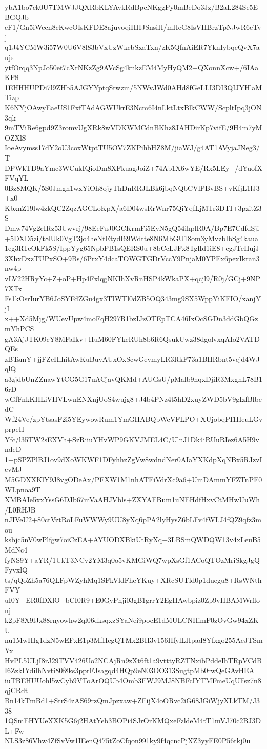 ybA1bo7ck0U7TMWJJQXRbKLYAvkRdBpcNKggPy0mBeDo3Jz/B2aL284Se5EBGQJb
eF1/Gn5iWecn8cKwcOIsKFDE8ajuvoqiHHJSnsiH/mHeG8IsVHBrzTpNJwR6eTvj
q1J4YCMW3i57W0U6V8l83bVxUzWkcbSxaTxn/zK5QfnAiER7YknIybqeQvX7aujs
ytfOrqq3NpJo50et7cXrNKzZg9AVcSg4knkzEM4MyHyQM2+QXonnXcw+/6IAaKF8
1EHHHUPDi7l9ZHb5AJGYYptqStwzm/5NWvJWd0AHd8fGeLLI3DI3QIJYHlaMTizp
K6NYjOAwyEaeUS1FxfTAdAGWUkrE3Ncm6I4nLktLtxBlkCWW/ScpltIpq3jON3qk
9mTViRe6gpd9Z3romvUgXRk8wVDKWMCdnBKhz8JAHDirKp7vifE/9H4m7yMOZXlS
IoeAvymss17dY2oU3coxWtptTU5OV7ZKPihbHZ8M/jiaWJ/g4AT1AVyjaJNeg3/T
DPWkTD9aYmc3WCukIQioDm8XFkuagJoiZ+74Ab1X6wYE/Rx5LEy+/dYuofXFVqYL
0Bz8MQK/5S0Jmgh1wxYiOh8ojyThDnRRJLBk6jbqNQbCVlPBvBS+vKfjL1lJ3+x0
KbxnZ19lw4zkQC2ZqzAGCLoKpX/a6D04wsRrWnr75QiYqfLjMTr3DTI+3pzitZ3S
Dmw74Vg2cIRz53Uwvrj/98EeFuJ0GCKrmFi5EyN5gQ54ihplR0A/Bp7E7CdfdSji
+5DXD5zi/t8lUk0VgT3jo4heNtEtydI69Wdtte8N6MbGU18om3yMvzbIbSg4kaua
1eg3RTeOkFk5S/IppYyg65NpbPB1sQERS0u+8bCcLJFx8TglId1iE8+egJTeHujJ
3XhxDxzTUPxSO+9Bs/6PrxY4dcaTOWGTGDrVccY9PnjaM0YPEx6pexIkran3nw4p
vLV22HRyYc+Z+oP+Hp4FxlqgNKIhXvRnHSP4kWkaPX+qcjl9/R0j/GCj+9NP7XTx
Fs1kOsrIurYB6JoSYFdZGu4gx3TIWTl0dZB5OQ343mg9SX5WppYiKFIO/xanjYjI
x++Xd5Mjg/WUevUpw4moFqH297B1bzIJzOTEpTCA46IxOcSGDn3ddGbQGzmYhPCS
gA3AjJTK09cY8MFaIkv+HuM60FYkcRUh8b6R6QsukUwz38dgolvxqAIo2VATDQEs
zBTsmY+jjFZeHlhitAwKuBuvAUxOxScwGevmyLR3RkF73a1BHRbnt5vcjd4WJqlQ
a3zjdbUnZZnawYtCG5G17uACjavQKMd+AUGsU/pMalb9nqxDjiR3MxghL78B16rD
wGfFnkKHLiVHVLwnENXnjUoS4wujg8+J4b4PNz4t5hD2xuyZWD5bV9gIzfBlbedC
Wf24Ve/zpYtsasF2i5YEywowRum1YmGHABQbWcVFLPO+XUjobqPI1HeuLGvprpeH
Yfc/l35TW2sEXVh+SzRiiuYHvWP9GKVJMEL4C/UlnJ1Dk4iRUuRIez6A5H9vndeD
1+pSPZPlBJ1ov9dXoWKWF1DFyhhzZgVw8wdndNer0AIaYXKdpXqNBx5RJzvIcvMJ
M5GDXXKlY9J8vgODeAx/PFXW1M1nhATFiVdrXc9a6+UmDAmmYFZTnPF0WLpnoa9T
XMBAIe5xxYssG6DJb67mVaAHJVbls+ZXYAFBum1uNEHdfHxvCtMHwUuWh/L0RHJB
nJIVeU2+80ctVztRoLFuWWWy9UU8yXq6pPA2lyHysZ6bLFv4fWLJ4fQZ9qfz3mou
ksbjc5nV0wPlfgw7oiCzEA+AYUODXBkiUtRyXq+3LBSmQWDQW13v4xLeuB5MdNc4
fyNS9Y+aYR/1UkT3NCv2YM3q0o5vKMGiWQ7wpXsGf1ACoQTOzMriSkgJgQFyvxlQ
ts/qQoZh5a76QLFpWZyhMq1SFkVldFheYKuy+XRcSUTld0p1duegu8+RsWNthFVY
uI0Y+ER0fDXlO+bCI0R9+E0GyPhji03gB1grrY2EgHAwbpiz0Zp9vHBAMWrflonj
k2pF8X9lJx88rnyowhw2ql06dksqxzSYaNei9pocE1dMULCNHimF0zOvGw94xZKU
nu1MwHIg1dzN5wEFxE1p3MfHcgQTMx2BH3v156HfylLHpad8Yfxgo255AeJTSmYx
HvPL5ULjI8rJ29TVV426Uo2NCAjRn9zXt6ft1a9vtttyRZTNxibPddeIhTRpVCdB
I6ZzkIYdilhNvti80f8ks3pprFJsagqd4HQp9eN03OO313SugtpMb0rwQeGAvHEA
iuTBEHUUohl5wCyb9VToArOQUb4Omb3FWJ9MJ8NBFcIYTMFmeUqUFsz7n8qjCRdt
Bn14kTmBd1+StrS4zAS69rzQmJpzxaw+ZFijX4oORvc2iG68JGiWjyXLkTM/J338
1QSmEHYUeXXK5G6j2HAtYeb3BOPi4SJrOrKMQxeFzldeM4tT1mVJ70c2BJ3DL+Fw
NLS3z86Vhw4ZfSvVw1IEenQ475tZoCfqon991ky9f4qcncPjXZ3yyFE0P56tkj0u
